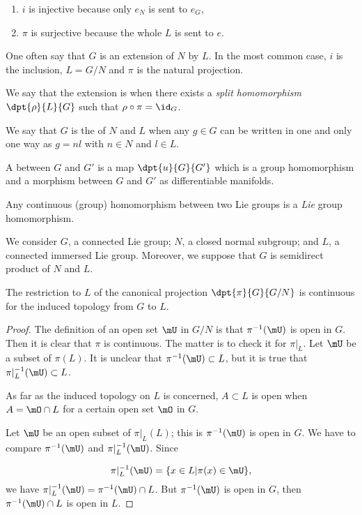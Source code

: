 \begin{enumerate}
\item $i$ is injective because only $e_N$ is sent to $e_G$,
\item $\pi$ is surjective because the whole $L$ is sent to $e$.
\end{enumerate}
One often say that $G$ is an extension of $N$ by $L$. In the most common case, $i$ is the inclusion, $L=G/N$ and $\pi$ is the natural projection.

We say that the extension is  when there exists a \emph{split homomorphism} $\dpt{\rho}{L}{G}$ such that $\rho\circ\pi=\id_G$. 

\begin{definition}
We say that $G$ is the  of $N$ and $L$ when any $g\in G$ can be written in one and only one way as $g=nl$ with $n\in N$ and $l\in L$.
\end{definition}


\begin{definition}
A  between $G$ and $G'$ is a map $\dpt{u}{G}{G'}$ which is a group homomorphism and a morphism between $G$ and $G'$ as differentiable manifolds.
\end{definition}

\begin{lemma}
Any continuous (group) homomorphism between two Lie groups is a \emph{Lie} group homomorphism.
\end{lemma}

We consider $G$, a connected Lie group; $N$, a closed normal subgroup; and $L$, a connected immersed Lie group. Moreover, we suppose that $G$ is semidirect product of $N$ and $L$.

\begin{proposition}
The restriction to $L$ of the canonical projection $\dpt{\pi}{G}{G/N}$ is continuous for the induced topology from $G$ to $L$.
\end{proposition}
\begin{proof}
      The definition of an open set $\mU$ in $G/N$ is that $\pi^{-1}(\mU)$ is open in $G$. Then it is clear that $\pi$ is continuous. The matter is to check it for $\pi|_L$. Let $\mU$ be a subset of $\pi(L)$. It is unclear that $\pi^{-1}(\mU)\subset L$, but it is true that $\pi|_L^{-1}(\mU)\subset L$.
      
      As far as the induced topology on $L$ is concerned, $A\subset L$ is open when $A=\mO\cap L$ for a certain open set $\mO$ in $G$.
      
      Let $\mU$ be an open subset of $\pi|_L(L)$; this is $\pi^{-1}(\mU)$ is open in $G$. We have to compare $\pi^{-1}(\mU)$ and $\pi|_L^{-1}(\mU)$. Since
      
    \[
        \pi|_L^{-1}(\mU)=\{x\in L|\pi(x)\in\mU\},
    \]
    we have $\pi|_L^{-1}(\mU)=\pi^{-1}(\mU)\cap L$. But $\pi^{-1}(\mU)$ is open in $G$, then $\pi^{-1}(\mU)\cap L$ is open in $L$.
\end{proof}

